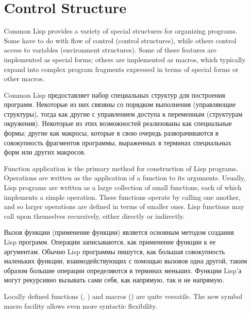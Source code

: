 
\clearpage\def\pagestatus{ULTIMATE}

\chapter{Control Structure}
\label{CONTRL}

Common Lisp provides a variety of special structures for organizing
programs.  Some have to do with flow of control (control structures),
while others control access to variables (environment structures).
Some of these features are implemented as special forms;
others are implemented as macros, which typically expand into
complex program fragments expressed in terms of special forms
or other macros.

Common Lisp предоставляет набор специальных структур для построения
программ. Некоторые из них связяны со порядком выполнения (управляющие
структуры), тогда как другие с управлением доступа к переменным (структурам
окружения).
Некоторые из этих возможностей реализованы как специальные формы;
другие как макросы, которые в свою очередь разворачиваются в совокупность
фрагментов программы, выраженных в терминах специальных форм или других
макросов.

Function application is the primary method for construction of Lisp
programs.  Operations are written as the application of a function
to its arguments.  Usually, Lisp programs are written as a large collection
of small functions, each of which implements a simple operation.
These functions operate by calling one another, and so larger
operations are defined in terms of smaller ones.
Lisp functions may call upon themselves recursively,
either directly or indirectly.

Вызов функции (применение функции) является основным методом создания Lisp
программ. Операции записываются, как применение функции к ее аргументам. Обычно
Lisp программы пишутся, как большая совокупность маленьких функции,
взаимодействующих с помощью вызовов одна другой, таким образом большие операции
определяются в терминах меньших.
Функции Lisp'а могут рекурсивно вызывать сами себя, как напрямую, так и не
напрямую.

\begin{new}
Locally defined functions (, ) and macros ()
are quite versatile.
The new symbol macro facility allows even more syntactic flexibility.
\end{new}

